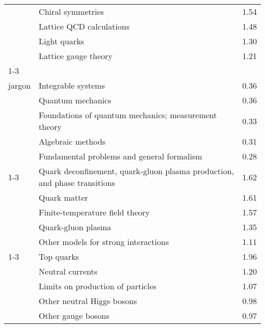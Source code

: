 \begin{longtable}[H]{p{}|p{}|p{}}
                                        & Chiral symmetries &  1.54 \\
                                        & Lattice QCD calculations &  1.48 \\
                                        & Light quarks &  1.30 \\
                                        & Lattice gauge theory &  1.21 \\
\cline{1-3}
\multirow{5}{*}{\begin{tabular}{l}Theoretical\\ jargon\end{tabular}} & Integrable systems &  0.36 \\
                                        & Quantum mechanics &  0.36 \\
                                        & Foundations of quantum mechanics; measurement theory &  0.33 \\
                                        & Algebraic methods &  0.31 \\
                                        & Fundamental problems and general formalism &  0.28 \\
\cline{1-3}
\multirow{5}{*}{\begin{tabular}{l}Thermodynamics\end{tabular}} & Quark deconfinement, quark-gluon plasma production, and phase transitions &  1.62 \\
                                        & Quark matter &  1.61 \\
                                        & Finite-temperature field theory &  1.57 \\
                                        & Quark-gluon plasma &  1.35 \\
                                        & Other models for strong interactions &  1.11 \\
\cline{1-3}
\multirow{5}{*}{\begin{tabular}{l}Top quark\end{tabular}} & Top quarks &  1.96 \\
                                        & Neutral currents &  1.20 \\
                                        & Limits on production of particles &  1.07 \\
                                        & Other neutral Higgs bosons &  0.98 \\
                                        & Other gauge bosons &  0.97 \\

\end{longtable}
